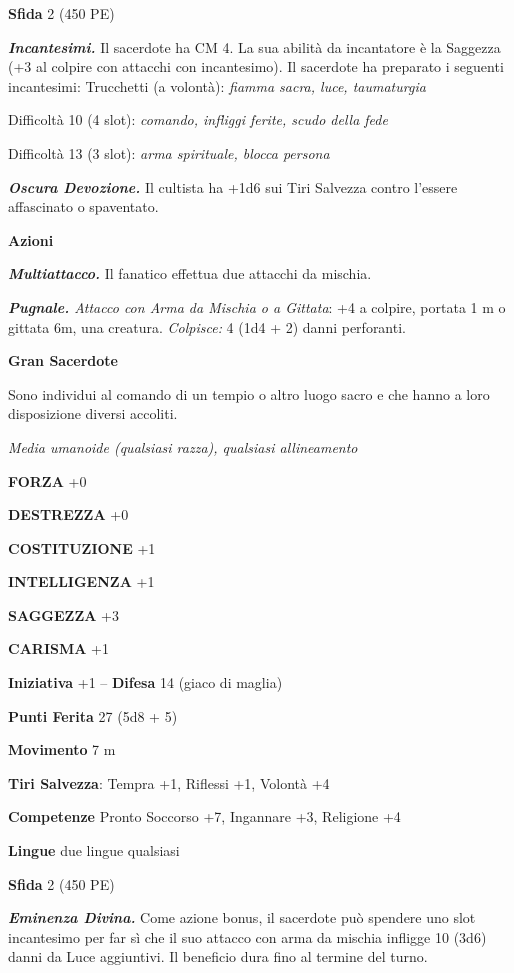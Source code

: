 \begin{multicols}{2}
\textbf{Sfida} 2 (450 PE)

\emph{\textbf{Incantesimi.}} Il sacerdote ha CM 4. La sua abilità da incantatore è la Saggezza (+3 al colpire con attacchi con incantesimo). Il sacerdote ha preparato i seguenti incantesimi: Trucchetti (a volontà): \emph{fiamma sacra, luce, taumaturgia}

Difficoltà 10 (4 slot): \emph{comando, infliggi ferite, scudo della fede}

Difficoltà 13 (3 slot): \emph{arma spirituale, blocca persona}

\emph{\textbf{Oscura Devozione.}} Il cultista ha +1d6 sui Tiri Salvezza contro l'essere affascinato o spaventato.

\textbf{Azioni}

\emph{\textbf{Multiattacco.}} Il fanatico effettua due attacchi da mischia.

\emph{\textbf{Pugnale.} Attacco con Arma da Mischia o a Gittata}: +4 a colpire, portata 1 m o gittata 6m, una creatura. \emph{Colpisce:} 4 (1d4 + 2) danni perforanti.

\medskip\textbf{Gran Sacerdote}

Sono individui al comando di un tempio o altro luogo sacro e che hanno a loro disposizione diversi accoliti.

\emph{Media umanoide (qualsiasi razza), qualsiasi allineamento}

\textbf{FORZA} +0

\textbf{DESTREZZA} +0

\textbf{COSTITUZIONE} +1

\textbf{INTELLIGENZA} +1

\textbf{SAGGEZZA} +3

\textbf{CARISMA} +1

\textbf{Iniziativa} +1 -- \textbf{Difesa} 14 (giaco di maglia)

\textbf{Punti Ferita} 27 (5d8 + 5)

\textbf{Movimento} 7 m

\textbf{Tiri Salvezza}: Tempra +1, Riflessi +1, Volontà +4 

\textbf{Competenze} Pronto Soccorso +7, Ingannare +3, Religione +4

\textbf{Lingue} due lingue qualsiasi

\textbf{Sfida} 2 (450 PE)

\emph{\textbf{Eminenza Divina.}} Come azione bonus, il sacerdote può spendere uno slot incantesimo per far sì che il suo attacco con arma da mischia infligge 10 (3d6) danni da Luce aggiuntivi. Il beneficio dura fino al termine del turno.


\end{multicols}
